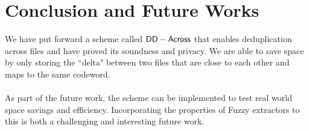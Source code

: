 \chapter{Conclusion and Future Works}
\label{chap:future}

We have put forward a scheme called $\mathsf{DD-Across}$ that enables deduplication across files and have proved its soundness and privacy. We are able to save space by only storing the ``delta" between two files that are close to each other and maps to the same codeword.
\\ \\
\noindent
As part of the future work, the scheme can be implemented to test real world space savings and efficiency.
Incorporating the properties of Fuzzy extractors \cite{fuzzy} to this is both a challenging and interesting future work.